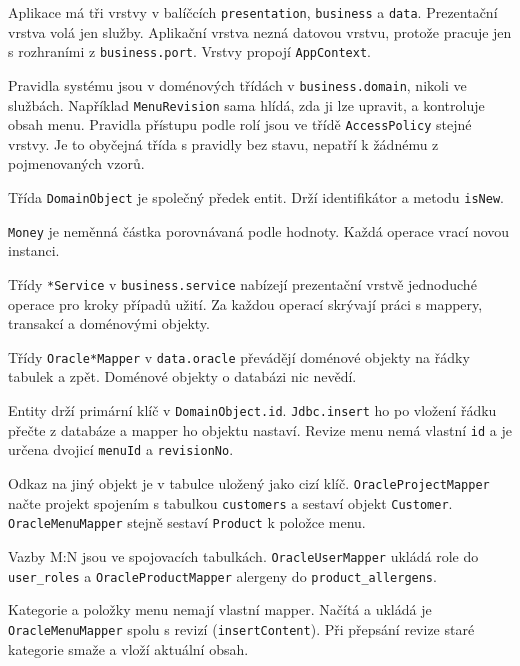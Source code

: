 \begin{description}[itemsep=2pt,style=unboxed]
  \item[Layers] Aplikace má tři vrstvy v balíčcích \texttt{presentation}, \texttt{business} a \texttt{data}. Prezentační vrstva volá jen služby. Aplikační vrstva nezná datovou vrstvu, protože pracuje jen s rozhraními z \texttt{business.port}. Vrstvy propojí \texttt{AppContext}.
  \item[Domain Model] Pravidla systému jsou v doménových třídách v \texttt{business.domain}, nikoli ve službách. Například \texttt{MenuRevision} sama hlídá, zda ji lze upravit, a kontroluje obsah menu. Pravidla přístupu podle rolí jsou ve třídě \texttt{AccessPolicy} stejné vrstvy. Je to obyčejná třída s pravidly bez stavu, nepatří k žádnému z pojmenovaných vzorů.
  \item[Layer Supertype] Třída \texttt{DomainObject} je společný předek entit. Drží identifikátor a metodu \texttt{isNew}.
  \item[Value Object] \texttt{Money} je neměnná částka porovnávaná podle hodnoty. Každá operace vrací novou instanci.
  \item[Service Layer a Facade] Třídy \texttt{*Service} v \texttt{business.service} nabízejí prezentační vrstvě jednoduché operace pro kroky případů užití. Za každou operací skrývají práci s mappery, transakcí a doménovými objekty.
  \item[Data Mapper] Třídy \texttt{Oracle*Mapper} v \texttt{data.oracle} převádějí doménové objekty na řádky tabulek a zpět. Doménové objekty o databázi nic nevědí.
  \item[Identity Field] Entity drží primární klíč v \texttt{DomainObject.id}. \texttt{Jdbc.insert} ho po vložení řádku přečte z databáze a mapper ho objektu nastaví. Revize menu nemá vlastní \texttt{id} a je určena dvojicí \texttt{menuId} a \texttt{revisionNo}.
  \item[Foreign Key Mapping] Odkaz na jiný objekt je v tabulce uložený jako cizí klíč. \texttt{OracleProjectMapper} načte projekt spojením s tabulkou \texttt{customers} a sestaví objekt \texttt{Customer}. \texttt{OracleMenuMapper} stejně sestaví \texttt{Product} k položce menu.
  \item[Association Table Mapping] Vazby M:N jsou ve spojovacích tabulkách. \texttt{OracleUserMapper} ukládá role do \texttt{user\_roles} a \texttt{OracleProductMapper} alergeny do \texttt{product\_allergens}.
  \item[Dependent Mapping] Kategorie a položky menu nemají vlastní mapper. Načítá a ukládá je \texttt{OracleMenuMapper} spolu s revizí (\texttt{insertContent}). Při přepsání revize staré kategorie smaže a vloží aktuální obsah.

\end{description}
